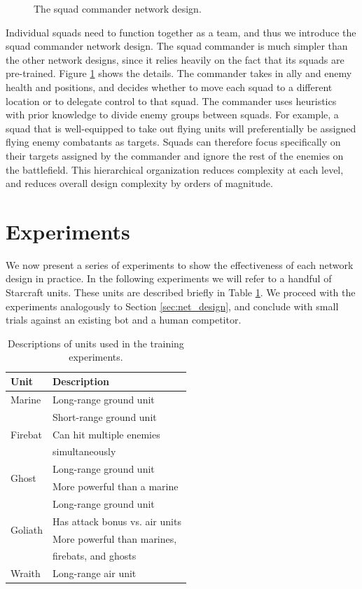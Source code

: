 \documentclass[10pt,a4paper,twocolumn]{article}
\begin{document}
\begin{figure}

\caption{The squad commander network design.}
\label{fig:quad_commander_design}
\end{figure}

Individual squads need to function together as a team, and thus we introduce the squad commander network design. The squad commander is much simpler than the other network designs, since it relies heavily on the fact that its squads are pre-trained. Figure \ref{fig:quad_commander_design} shows the details. The commander takes in ally and enemy health and positions, and decides whether to move each squad to a different location or to delegate control to that squad. The commander uses heuristics with prior knowledge to divide enemy groups between squads. For example, a squad that is well-equipped to take out flying units will preferentially be assigned flying enemy combatants as targets. Squads can therefore focus specifically on their targets assigned by the commander and ignore the rest of the enemies on the battlefield. This hierarchical organization reduces complexity at each level, and reduces overall design complexity by orders of magnitude.

\section{Experiments}
\label{sec:exp}

We now present a series of experiments to show the effectiveness of each network design in practice. In the following experiments we will refer to a handful of Starcraft units. These units are described briefly in Table \ref{tab:units}. We proceed with the experiments analogously to Section \ref{sec:net_design}, and conclude with small trials against an existing bot and a human competitor.

\begin{table}
\centering
\begin{tabular}{|l|l|}
	\hline
	{\bf Unit} & {\bf Description} \\ \hline
	Marine & Long-range ground unit \\ \hline
	\multirow{3}{*}{Firebat} & Short-range ground unit \\
	& Can hit multiple enemies \\
	& simultaneously \\ \hline
	\multirow{2}{*}{Ghost} & Long-range ground unit \\
	& More powerful than a marine\\ \hline
	\multirow{4}{*}{Goliath} & Long-range ground unit \\
	& Has attack bonus vs. air units \\
	& More powerful than marines, \\
	& firebats, and ghosts \\ \hline
	Wraith & Long-range air unit \\ \hline
\end{tabular}
\caption{Descriptions of units used in the training experiments.}
\label{tab:units}
\end{table}
	
\end{document}

